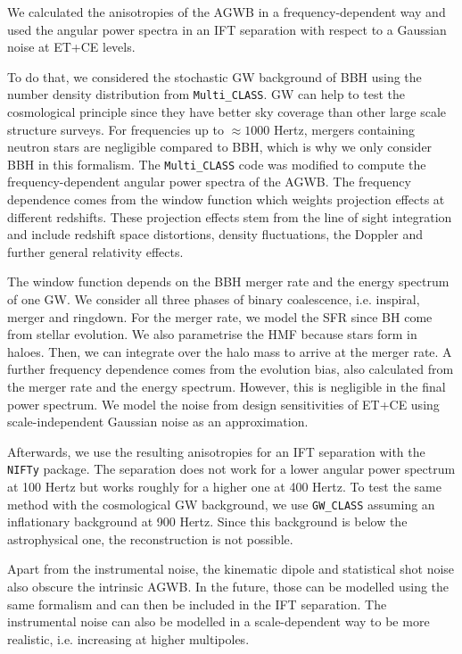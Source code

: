 We calculated the anisotropies of the AGWB in a frequency-dependent way and used the angular power spectra in an IFT separation with respect to a Gaussian noise at ET+CE levels.

To do that, we considered the stochastic GW background of BBH using the number density distribution from {\tt Multi\_CLASS}. GW can help to test the cosmological principle since they have better sky coverage than other large scale structure surveys. For frequencies up to $\approx 1000$ Hertz, mergers containing neutron stars are negligible compared to BBH, which is why we only consider BBH in this formalism.
The {\tt Multi\_CLASS} code was modified to compute the frequency-dependent angular power spectra of the AGWB. The frequency dependence comes from the window function which weights projection effects at different redshifts. These projection effects stem from the line of sight integration and include redshift space distortions, density fluctuations, the Doppler and further general relativity effects. 

The window function depends on the BBH merger rate and the energy spectrum of one GW. We consider all three phases of binary coalescence, i.e. inspiral, merger and ringdown. For the merger rate, we model the SFR since BH come from stellar evolution. We also parametrise the HMF because stars form in haloes. Then, we can integrate over the halo mass to arrive at the merger rate. 
A further frequency dependence comes from the evolution bias, also calculated from the merger rate and the energy spectrum. However, this is negligible in the final power spectrum.
We model the noise from design sensitivities of ET+CE using scale-independent Gaussian noise as an approximation.

Afterwards, we use the resulting anisotropies for an IFT separation with the {\tt NIFTy} package. The separation does not work for a lower angular power spectrum at 100 Hertz but works roughly for a higher one at 400 Hertz.
To test the same method with the cosmological GW background, we use {\tt GW\_CLASS} assuming an inflationary background at 900 Hertz. Since this background is below the astrophysical one, the reconstruction is not possible.


Apart from the instrumental noise, the kinematic dipole and statistical shot noise also obscure the intrinsic AGWB. In the future, those can be modelled using the same formalism and can then be included in the IFT separation. The instrumental noise can also be modelled in a scale-dependent way to be more realistic, i.e. increasing at higher multipoles. 

